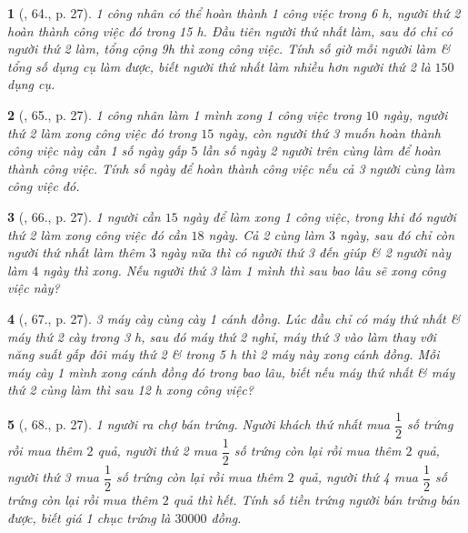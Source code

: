 \documentclass{article}
\newtheorem{baitoan}{}
\begin{document}
\begin{baitoan}[\cite{Binh_Toan_6_tap_2}, 64., p. 27]
	1 công nhân có thể hoàn thành 1 công việc trong {\rm6 h}, người thứ 2 hoàn thành công việc đó trong {\rm15 h}. Đầu tiên người thứ nhất làm, sau đó chỉ có người thứ 2 làm, tổng cộng {\rm9h} thì xong công việc. Tính số giờ mỗi người làm \& tổng số dụng cụ làm được, biết người thứ nhất làm nhiều hơn người thứ 2 là $150$ dụng cụ.
\end{baitoan}

\begin{baitoan}[\cite{Binh_Toan_6_tap_2}, 65., p. 27]
	1 công nhân làm 1 mình xong 1 công việc trong $10$ ngày, người thứ 2 làm xong công việc đó trong $15$ ngày, còn người thứ 3 muốn hoàn thành công việc này cần 1 số ngày gấp $5$ lần số ngày 2 người trên cùng làm để hoàn thành công việc. Tính số ngày để hoàn thành công việc nếu cả 3 người cùng làm công việc đó.
\end{baitoan}

\begin{baitoan}[\cite{Binh_Toan_6_tap_2}, 66., p. 27]
	1 người cần $15$ ngày để làm xong 1 công việc, trong khi đó người thứ 2 làm xong công việc đó cần $18$ ngày. Cả 2 cùng làm $3$ ngày, sau đó chỉ còn người thứ nhất làm thêm $3$ ngày nữa thì có người thứ 3 đến giúp \& 2 người này làm $4$ ngày thì xong. Nếu người thứ 3 làm 1 mình thì sau bao lâu sẽ xong công việc này?
\end{baitoan}

\begin{baitoan}[\cite{Binh_Toan_6_tap_2}, 67., p. 27]
	3 máy cày cùng cày 1 cánh đồng. Lúc đầu chỉ có máy thứ nhất \& máy thứ 2 cày trong {\rm3 h}, sau đó máy thứ 2 nghỉ, máy thứ 3 vào làm thay với năng suất gấp đôi máy thứ 2 \& trong {\rm5 h} thì 2 máy này xong cánh đồng. Mỗi máy cày 1 mình xong cánh đồng đó trong bao lâu, biết nếu máy thứ nhất \& máy thứ 2 cùng làm thì sau {\rm12 h} xong công việc?
\end{baitoan}

\begin{baitoan}[\cite{Binh_Toan_6_tap_2}, 68., p. 27]
	1 người ra chợ bán trứng. Người khách thứ nhất mua $\dfrac{1}{2}$ số trứng rồi mua thêm $2$ quả, người thứ 2 mua $\dfrac{1}{2}$ số trứng còn lại rồi mua thêm $2$ quả, người thứ 3 mua $\dfrac{1}{2}$ số trứng còn lại rồi mua thêm $2$ quả, người thứ 4 mua $\dfrac{1}{2}$ số trứng còn lại rồi mua thêm $2$ quả thì hết. Tính số tiền trứng người bán trứng bán được, biết giá 1 chục trứng là $30000$ đồng.
\end{baitoan}
\end{document}
